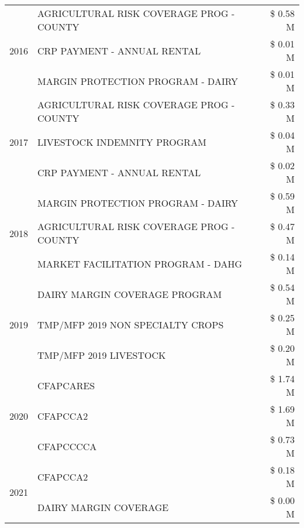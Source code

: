 \begin{tabular}{llr}
\cline{1-3}
\multirow[t]{3}{*}{2016} & AGRICULTURAL RISK COVERAGE PROG - COUNTY & \$ 0.58 M \\
 & CRP PAYMENT - ANNUAL RENTAL & \$ 0.01 M \\
 & MARGIN PROTECTION PROGRAM - DAIRY & \$ 0.01 M \\
\cline{1-3}
\multirow[t]{3}{*}{2017} & AGRICULTURAL RISK COVERAGE PROG - COUNTY & \$ 0.33 M \\
 & LIVESTOCK INDEMNITY PROGRAM & \$ 0.04 M \\
 & CRP PAYMENT - ANNUAL RENTAL & \$ 0.02 M \\
\cline{1-3}
\multirow[t]{3}{*}{2018} & MARGIN PROTECTION PROGRAM - DAIRY & \$ 0.59 M \\
 & AGRICULTURAL RISK COVERAGE PROG - COUNTY & \$ 0.47 M \\
 & MARKET FACILITATION PROGRAM - DAHG & \$ 0.14 M \\
\cline{1-3}
\multirow[t]{3}{*}{2019} & DAIRY MARGIN COVERAGE PROGRAM & \$ 0.54 M \\
 & TMP/MFP 2019 NON SPECIALTY CROPS & \$ 0.25 M \\
 & TMP/MFP 2019 LIVESTOCK & \$ 0.20 M \\
\cline{1-3}
\multirow[t]{3}{*}{2020} & CFAPCARES & \$ 1.74 M \\
 & CFAPCCA2 & \$ 1.69 M \\
 & CFAPCCCCA & \$ 0.73 M \\
\cline{1-3}
\multirow[t]{2}{*}{2021} & CFAPCCA2 & \$ 0.18 M \\
 & DAIRY MARGIN COVERAGE & \$ 0.00 M \\
\cline{1-3}
\bottomrule
\end{tabular}

